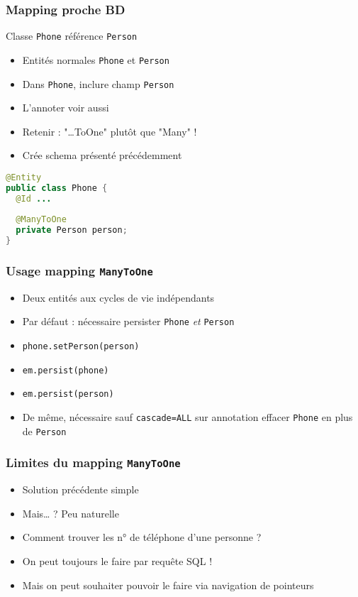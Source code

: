 \documentclass[french, english]{beamer}
\begin{document}
\begin{frame}[fragile]
	\frametitle{Mapping proche BD}
	Classe \texttt{Phone} référence \texttt{Person}
	\begin{itemize}
		\item Entités normales \texttt{Phone} et \texttt{Person}
		\item Dans \texttt{Phone}, inclure champ \texttt{Person}
		\item L’annoter  {\tiny voir aussi }
		\item Retenir : "…ToOne" plutôt que "Many" !
		 \item Crée schema présenté précédemment
	\end{itemize}
	\begin{lstlisting}[language=Java]
@Entity
public class Phone {
  @Id ...
  
  @ManyToOne
  private Person person;
}
	\end{lstlisting}
\end{frame}

\begin{frame}
	\frametitle{Usage mapping \texttt{ManyToOne}}
	\begin{itemize}
		\item Deux entités aux cycles de vie indépendants
		\item Par défaut : nécessaire persister \texttt{Phone} \emph{et} \texttt{Person}
		\item \texttt{phone.setPerson(person)}
		\item \texttt{em.persist(phone)}
		\item \texttt{em.persist(person)}
		\item De même, nécessaire {\tiny sauf \texttt{cascade=ALL} sur annotation} effacer \texttt{Phone} en plus de \texttt{Person}
	\end{itemize}
\end{frame}

\begin{frame}
	\frametitle{Limites du mapping \texttt{ManyToOne}}
	\begin{itemize}
		\item Solution précédente simple
		\item Mais… ? \pause Peu naturelle \pause
		\item Comment trouver les n° de téléphone d’une personne ? \pause
		\item On peut toujours le faire par requête SQL !
		\item Mais on peut souhaiter pouvoir le faire via navigation de pointeurs
	\end{itemize}
\end{frame}
\end{document}
